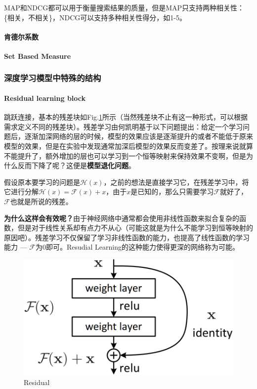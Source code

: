 MAP和NDCG都可以用于衡量搜索结果的质量，但是MAP只支持两种相关性：\{相关，不相关\}，NDCG可以支持多种相关性得分，如1-5。


\paragraph{肯德尔系数}

\paragraph{Set Based Measure}

\subsubsection{深度学习模型中特殊的结构}
\paragraph{Residual learning block}
跳跃连接，基本的残差块如Fig.\ref{fig:residual}所示（当然残差块不止有这一种形式，可以根据需求定义不同的残差块）。残差学习由何凯明基于以下问题提出：给定一个学习问题后，逐渐加深网络的层的时候，模型的效果应该是逐渐提升的或者不能低于原来模型的效果，但是在实验中发现通常加深后模型的效果反而变差了。按理来说就算不能提升了，额外增加的层也可以学习到一个恒等映射来保持效果不变啊，但是为什么反而下降了呢？这便是\textbf{模型退化问题}。

假设原本要学习的问题是$\mathcal{H}(x)$，之前的想法是直接学习它，在残差学习中，将它进行分解$\mathcal{H}(x) = \mathcal{F}(x) + x$，由于$x$是已知的，那么只需要学习$\mathcal{F}$就好了，$\mathcal{F}$也就是所说的残差。

\textbf{为什么这样会有效呢？}由于神经网络中通常都会使用非线性函数来拟合复杂的函数，但是对于线性关系却有点力不从心（可能这就是为什么不能学习到恒等映射的原因吧）。残差学习不仅保留了学习非线性函数的能力，也提高了线性函数的学习能力 --- $\mathcal{F}$为0即可。Resudial Learning的这种能力使得更深的网络称为可能。

\begin{figure}[h]
	\centering
	\includegraphics[width=.4\textwidth]{pics/Residual.png}
	\caption{Residual}
	\label{fig:residual}
\end{figure}

